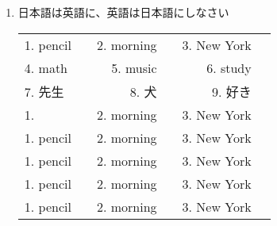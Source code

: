 \documentclass[fleqn]{jsarticle}
\begin{document}
\begin{enumerate}
  \item 日本語は英語に、英語は日本語にしなさい 
    \begin{table}[htb]
      \begin{tabular}{lcrrrr}
        1. pencil & \underline{\hspace{4zw}} & 2. morning & \underline{\hspace{3zw}} & 3. New York & \underline{\hspace{4zw}} \\
        4. math & \underline{\hspace{4zw}} & 5. music & \underline{\hspace{3zw}} & 6. study & \underline{\hspace{4zw}} \\
        7. 先生 & \underline{\hspace{4zw}} & 8. 犬 & \underline{\hspace{3zw}} & 9. 好き & \underline{\hspace{4zw}} \\
        1.  & \underline{\hspace{4zw}} & 2. morning & \underline{\hspace{3zw}} & 3. New York & \underline{\hspace{4zw}} \\
        1. pencil & \underline{\hspace{4zw}} & 2. morning & \underline{\hspace{3zw}} & 3. New York & \underline{\hspace{4zw}} \\
        1. pencil & \underline{\hspace{4zw}} & 2. morning & \underline{\hspace{3zw}} & 3. New York & \underline{\hspace{4zw}} \\
        1. pencil & \underline{\hspace{4zw}} & 2. morning & \underline{\hspace{3zw}} & 3. New York & \underline{\hspace{4zw}} \\
        1. pencil & \underline{\hspace{4zw}} & 2. morning & \underline{\hspace{3zw}} & 3. New York & \underline{\hspace{4zw}} \\

\end{tabular}
\end{table}
\end{enumerate}
\end{document}
